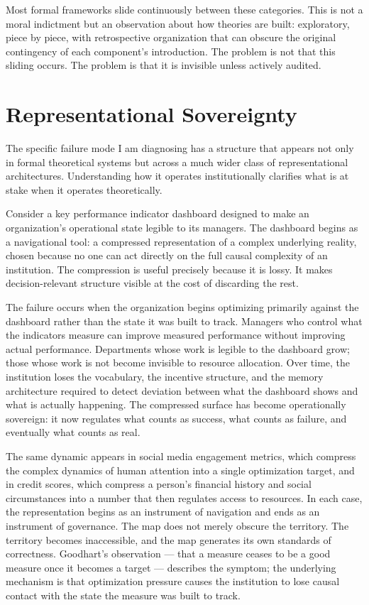 \documentclass[12pt, a4paper]{article}
\begin{document}
Most formal frameworks slide continuously between these categories. This is not a moral indictment but an observation about how theories are built: exploratory, piece by piece, with retrospective organization that can obscure the original contingency of each component's introduction. The problem is not that this sliding occurs. The problem is that it is invisible unless actively audited.

\section{Representational Sovereignty}

The specific failure mode I am diagnosing has a structure that appears not only in formal theoretical systems but across a much wider class of representational architectures. Understanding how it operates institutionally clarifies what is at stake when it operates theoretically.

Consider a key performance indicator dashboard designed to make an organization's operational state legible to its managers. The dashboard begins as a navigational tool: a compressed representation of a complex underlying reality, chosen because no one can act directly on the full causal complexity of an institution. The compression is useful precisely because it is lossy. It makes decision-relevant structure visible at the cost of discarding the rest.

The failure occurs when the organization begins optimizing primarily against the dashboard rather than the state it was built to track. Managers who control what the indicators measure can improve measured performance without improving actual performance. Departments whose work is legible to the dashboard grow; those whose work is not become invisible to resource allocation. Over time, the institution loses the vocabulary, the incentive structure, and the memory architecture required to detect deviation between what the dashboard shows and what is actually happening. The compressed surface has become operationally sovereign: it now regulates what counts as success, what counts as failure, and eventually what counts as real.

The same dynamic appears in social media engagement metrics, which compress the complex dynamics of human attention into a single optimization target, and in credit scores, which compress a person's financial history and social circumstances into a number that then regulates access to resources. In each case, the representation begins as an instrument of navigation and ends as an instrument of governance. The map does not merely obscure the territory. The territory becomes inaccessible, and the map generates its own standards of correctness. Goodhart's observation --- that a measure ceases to be a good measure once it becomes a target --- describes the symptom; the underlying mechanism is that optimization pressure causes the institution to lose causal contact with the state the measure was built to track.
\end{document}

